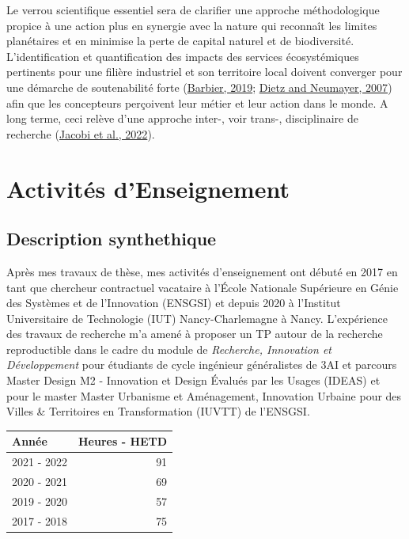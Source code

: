 \documentclass[
  11pt,
]{article}
\begin{document}
Le verrou scientifique essentiel sera de clarifier une approche
méthodologique propice à une action plus en synergie avec la nature qui
reconnaît les limites planétaires et en minimise la perte de capital
naturel et de biodiversité. L'identification et quantification des
impacts des services écosystémiques pertinents pour une filière
industriel et son territoire local doivent converger pour une démarche
de soutenabilité forte (\protect\hyperlink{ref-Barbier2019}{Barbier,
2019}; \protect\hyperlink{ref-Dietz2006}{Dietz and Neumayer, 2007}) afin
que les concepteurs perçoivent leur métier et leur action dans le monde.
A long terme, ceci relève d'une approche inter-, voir trans-,
disciplinaire de recherche (\protect\hyperlink{ref-Jacobi2022}{Jacobi et
al., 2022}).

\newpage

\hypertarget{activituxe9s-denseignement}{%
\section{Activités d'Enseignement}\label{activituxe9s-denseignement}}

\hypertarget{description-synthethique}{%
\subsection{Description synthethique}\label{description-synthethique}}

Après mes travaux de thèse, mes activités d'enseignement ont débuté en
2017 en tant que chercheur contractuel vacataire à l'École Nationale
Supérieure en Génie des Systèmes et de l'Innovation (ENSGSI) et depuis
2020 à l'Institut Universitaire de Technologie (IUT) Nancy-Charlemagne à
Nancy. L'expérience des travaux de recherche m'a amené à proposer un TP
autour de la recherche reproductible dans le cadre du module de
\emph{Recherche, Innovation et Développement} pour étudiants de cycle
ingénieur généralistes de 3AI et parcours Master Design M2 - Innovation
et Design Évalués par les Usages (IDEAS) et pour le master Master
Urbanisme et Aménagement, Innovation Urbaine pour des Villes \&
Territoires en Transformation (IUVTT) de l'ENSGSI.

\begin{table}
\centering
\begin{tabular}[t]{lr}
\toprule
Année & Heures - HETD\\
\midrule
2021 - 2022 & 91\\
2020 - 2021 & 69\\
2019 - 2020 & 57\\
2017 - 2018 & 75\\
\bottomrule
\end{tabular}
\end{table}
\end{document}
